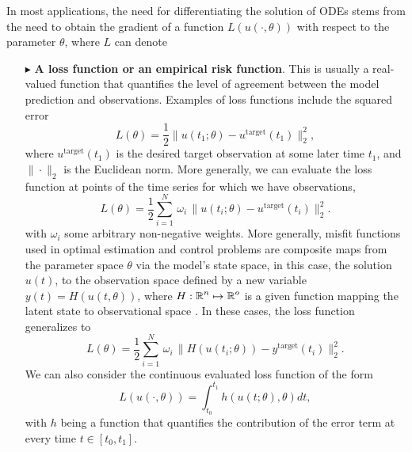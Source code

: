 In most applications, the need for differentiating the solution of ODEs stems from the need to obtain the gradient of a function $L(u(\cdot, \theta))$ with respect to the parameter $\theta$, where $L$ can denote
\begin{itemize}
    \item[$ \blacktriangleright$] \textbf{A loss function or an empirical risk function}. This is usually a real-valued function that quantifies the level of agreement between the model prediction and observations. Examples of loss functions include the squared error
    \begin{equation}
         L(\theta) = \frac{1}{2} \| u(t_1; \theta) - u^{\text{target}}(t_1) \|_2^2,
         \label{eq:quadratic-loss-function}
    \end{equation}
    where $u^{\text{target}}(t_1)$ is the desired target observation at some later time $t_1$, and $\| \cdot \|_2$ is the Euclidean norm.
    More generally, we can evaluate the loss function at points of the time series for which we have observations, 
    \begin{equation}
        L(\theta) 
        = 
        \frac{1}{2} \sum_{i=1}^N 
        \, \omega_i \,
        \| u(t_i; \theta) - u^{\text{target}}(t_i) \|_2^2.
        \label{eq:quadratic-loss-point}
    \end{equation}
    with $\omega_i$ some arbitrary non-negative weights.
    More generally, misfit functions used in optimal estimation and control problems are composite maps from the parameter space $\theta$ via the model's state space, in this case, the solution $u(t)$, to the observation space defined by a new variable $y(t) = H(u(t, \theta))$, where $H: \operatorname{\mathbb{R}}^n \mapsto \operatorname{\mathbb{R}}^o$ is a given function mapping the latent state to observational space \cite{1975-Bryson-Ho-optimal-control}. 
    In these cases, the loss function generalizes to 
    \begin{equation}
        L(\theta) 
        =
        \frac{1}{2} 
        \sum_{i=1}^N
        \, \omega_i \,
        \| H(u(t_i; \theta)) - y^{\text{target}}(t_i) \|_2^2.
        \label{eq:loss-state-observation}
    \end{equation}
    We can also consider the continuous evaluated loss function of the form
    \begin{equation}
         L(u(\cdot, \theta)) = \int_{t_0}^{t_1} h( u(t;\theta), \theta)  dt, 
         \label{eq:integrated-loss-function}
    \end{equation}
    with $h$ being a function that quantifies the contribution of the error term at every time $t \in [t_0, t_1]$. 

\end{itemize}

